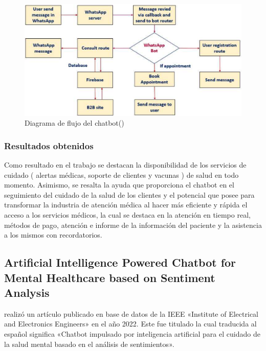 \begin{figure}[h]
	\begin{center}
		\includegraphics[width=1\textwidth]{2/figures/4_1.png}
		\caption{Diagrama de flujo del chatbot(\cite{pr_DDAIHWC})}
	\end{center}
\end{figure}

\subsubsection{Resultados obtenidos}

Como resultado en el trabajo se destacan la disponibilidad de los servicios de cuidado ( alertas médicas, soporte de clientes y vacunas ) de salud en todo momento. Asimismo, se resalta la ayuda que proporciona el chatbot en el seguimiento del cuidado de la salud de los clientes y el potencial que posee para transformar la industria de atención médica al hacer más eficiente y rápida el acceso a los servicios médicos, la cual se destaca en la atención en tiempo real, métodos de pago, atención e informe de la información del paciente y la asistencia a los mismos con recordatorios.



\subsection{Artificial Intelligence Powered Chatbot for Mental Healthcare based on Sentiment Analysis \citep*{pr_AIPCMHBSA}}

\citeauthor{pr_AIPCMHBSA} realizó un artículo publicado en base de datos de la IEEE «Institute of Electrical and Electronics Engineers» en el año 2022.
Este fue titulado  la cual traducida al español significa «Chatbot impulsado por inteligencia artificial para el cuidado de la salud mental basado en el análisis de sentimientos». 

